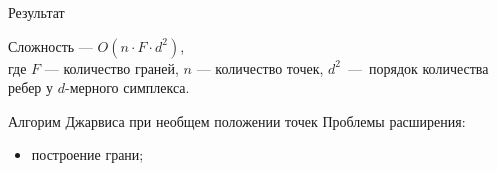 \documentclass[]{beamer} %
\begin{document}
\begin{frame}{Результат}

    Сложность --- $O(n\cdot F\cdot d^2)$,\\
    где $F$ --- количество граней, $n$ --- количество точек, $d^2$~---~порядок количества ребер у $d$-мерного симплекса.


\end{frame}
\begin{frame}{Алгорим Джарвиса при необщем положении точек}
    Проблемы расширения:
       \begin{itemize}
        \item  построение грани;
        \end{itemize}
\end{frame}





\end{document}
